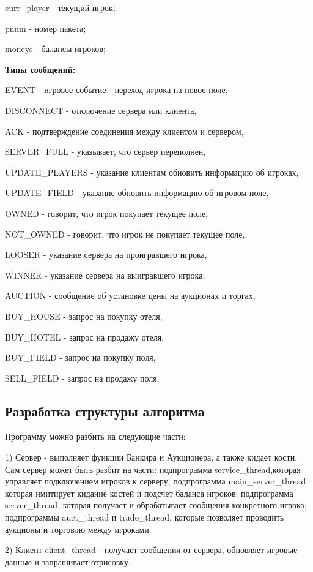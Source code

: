         curr\_player - текущий игрок;
        
        pnum - номер пакета;
        
        moneys - балансы игроков;

{\bf Типы сообщений:}

EVENT - игровое событие - переход игрока на новое поле,

DISCONNECT - отключение сервера или клиента,

ACK - подтверждение  соединения между клиентом и сервером,

SERVER\_FULL - указывает, что сервер переполнен,

UPDATE\_PLAYERS - указание клиентам обновить информацию об игроках,

UPDATE\_FIELD - указание обновить информацию об игровом поле,

OWNED - говорит, что игрок покупает текущее поле,

NOT\_OWNED - говорит, что игрок не покупает текущее поле,,

LOOSER - указание сервера на проигравшего игрока,

WINNER - указание сервера на выигравшего игрока,

AUCTION - сообщение об установке цены на аукционах и торгах,

BUY\_HOUSE - запрос на покупку отеля,

BUY\_HOTEL - запрос на продажу отеля,

BUY\_FIELD - запрос на покупку поля,

SELL\_FIELD - запрос на продажу поля.
\subsection{Разработка структуры алгоритма}
Программу можно разбить на следующие части:

1) Сервер - выполняет функции Банкира и Аукционера, а также кидает кости. Сам сервер может быть разбит на части: подпрограмма service\_thread,которая управляет подключением игроков к серверу; подпрограмма main\_server\_thread, которая имитирует кидание костей и подсчет баланса игроков; подпрограмма server\_thread, которая получает и обрабатывает сообщения конкретного игрока; подпрограммы auct\_thread и trade\_thread, которые позволяет проводить аукционы и торговлю между игроками.

2) Клиент client\_thread - получает сообщения от сервера, обновляет игровые данные и запрашивает отрисовку.

